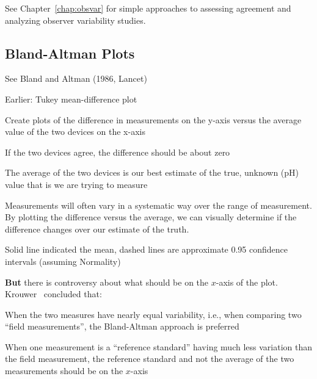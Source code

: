 See Chapter~\ref{chap:obsvar} for simple approaches to assessing agreement
and analyzing observer variability studies.

\subsection{Bland-Altman Plots} 

\bi 
  \item See Bland and Altman (1986, Lancet)
  \item Earlier: Tukey mean-difference plot
  \item Create plots of the difference in measurements on the y-axis
    versus the average value of the two devices on the x-axis 
  \item If the two devices agree, the difference should be about zero
  \item The average of the two devices is our best estimate of the
    true, unknown (pH) value that is we are trying to measure 
  \item Measurements will often vary in a systematic way over the
    range of measurement. By plotting the difference versus the
    average, we can visually determine if the difference changes over
    our estimate of the truth. 
  \item Solid line indicated the mean, dashed lines are approximate
    0.95 confidence intervals (assuming Normality) 
\ei

\textbf{But} there is controversy about what should be on the $x$-axis
of the plot.  Krouwer~\cite{kro08why} concluded that:
\bi
\item When the two measures have nearly equal variability, i.e., when
  comparing two ``field measurements'', the Bland-Altman approach is preferred
\item When one measurement is a ``reference standard'' having much less
  variation than the field measurement, the reference standard and not
  the average of the two measurements should be on the $x$-axis
\ei

